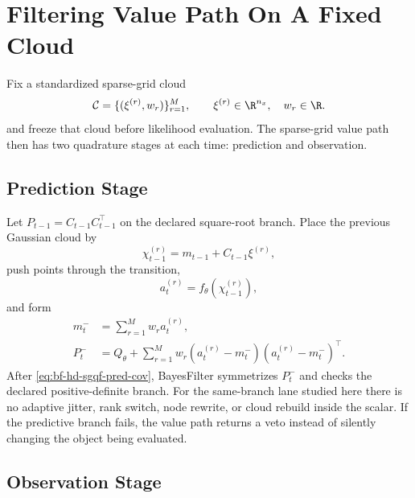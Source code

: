 \section{Filtering Value Path On A Fixed Cloud}
\label{sec:bf-hd-sgqf-value-path}

Fix a standardized sparse-grid cloud
\begin{equation}
  \mathcal C=\{(\xi^{(r)},w_r)\}_{r=1}^M,
  \qquad
  \xi^{(r)}\in\R^{n_x},
  \quad
  w_r\in\R.
  \label{eq:bf-hd-sgqf-cloud-for-filter}
\end{equation}
and freeze that cloud before likelihood evaluation.  The sparse-grid value path
then has two quadrature stages at each time: prediction and observation.

\subsection{Prediction Stage}
\label{sec:bf-hd-sgqf-prediction-stage}

Let \(P_{t-1}=C_{t-1}C_{t-1}^\top\) on the declared square-root branch.  Place
the previous Gaussian cloud by
\begin{equation}
  \chi_{t-1}^{(r)} = m_{t-1}+C_{t-1}\xi^{(r)},
  \label{eq:bf-hd-sgqf-pred-placed-points}
\end{equation}
push points through the transition,
\begin{equation}
  a_t^{(r)}=f_\theta(\chi_{t-1}^{(r)}),
  \label{eq:bf-hd-sgqf-transition-points}
\end{equation}
and form
\begin{align}
  m_t^-&=\sum_{r=1}^Mw_ra_t^{(r)},
  \label{eq:bf-hd-sgqf-pred-mean}\\
  P_t^-&=Q_\theta+\sum_{r=1}^Mw_r
  (a_t^{(r)}-m_t^-)(a_t^{(r)}-m_t^-)^\top.
  \label{eq:bf-hd-sgqf-pred-cov}
\end{align}
After \eqref{eq:bf-hd-sgqf-pred-cov}, BayesFilter symmetrizes \(P_t^-\) and
checks the declared positive-definite branch.  For the same-branch lane studied
here there is no adaptive jitter, rank switch, node rewrite, or cloud rebuild
inside the scalar.  If the predictive branch fails, the value path returns a
veto instead of silently changing the object being evaluated.

\subsection{Observation Stage}
\label{sec:bf-hd-sgqf-observation-stage}

